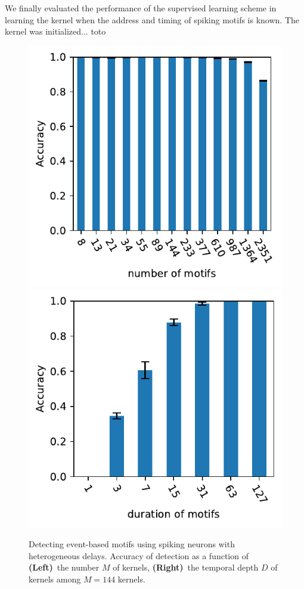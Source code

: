 \documentclass[runningheads]{llncs}
\begin{document}
We finally evaluated the performance of the supervised learning scheme in learning the kernel when the address and timing of spiking motifs is known. The kernel was initialized... toto

\begin{figure}%
  \centering
  \includegraphics[width=0.480\linewidth]{figures/THC_N_PGs.pdf}
  \includegraphics[width=0.480\linewidth]{figures/THC_N_PG_time.pdf}
    \caption{Detecting event-based motifs using spiking neurons with heterogeneous delays. 
Accuracy of detection as a function of  {\bf (Left)}~the number $M$ of kernels, 
    {\bf (Right)}~the temporal depth $D$ of kernels among $M=144$ kernels.
    }
  \label{fig:model_results}
\end{figure}
\end{document}
